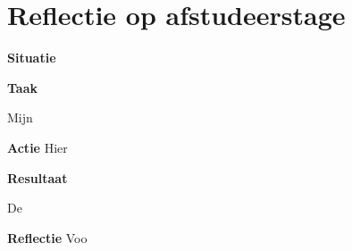 \section{Reflectie op afstudeerstage}
\textbf{Situatie}

\whitespace


\whitespace
\textbf{Taak}

\whitespace
Mijn

\whitespace
\textbf{Actie}
Hier

\whitespace
\textbf{Resultaat}

\whitespace
De 

\whitespace
\textbf{Reflectie}
Voo
